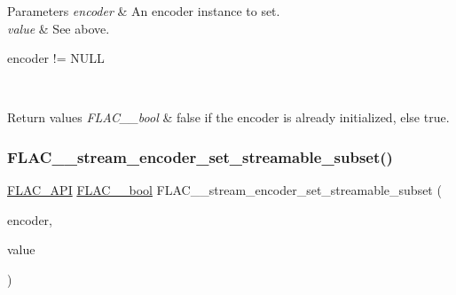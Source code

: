 {} 
\begin{DoxyParams}{Parameters}
{\em encoder} & An encoder instance to set. \\
\hline
{\em value} & See above.  
\begin{DoxyCode}
encoder != NULL 
\end{DoxyCode}
 \\
\hline
\end{DoxyParams}

\begin{DoxyRetVals}{Return values}
{\em F\+L\+A\+C\+\_\+\+\_\+bool} & {\ttfamily false} if the encoder is already initialized, else {\ttfamily true}. \\
\hline
\end{DoxyRetVals}
\mbox{\label{group__flac__stream__encoder_ga163f1acfe8b6b8ae849f0f4f7c0708f4}} 
\subsubsection{\texorpdfstring{F\+L\+A\+C\+\_\+\+\_\+stream\+\_\+encoder\+\_\+set\+\_\+streamable\+\_\+subset()}{FLAC\_\_stream\_encoder\_set\_streamable\_subset()}}
{\footnotesize\ttfamily \hyperlink{group__flac__export_ga56ca07df8a23310707732b1c0007d6f5}{F\+L\+A\+C\+\_\+\+A\+PI} \hyperlink{ordinals_8h_a95103469f1cbd78b8cf250194985b34e}{F\+L\+A\+C\+\_\+\+\_\+bool} F\+L\+A\+C\+\_\+\+\_\+stream\+\_\+encoder\+\_\+set\+\_\+streamable\+\_\+subset (\begin{DoxyParamCaption}\item[{\hyperlink{struct_f_l_a_c_____stream_encoder}{F\+L\+A\+C\+\_\+\+\_\+\+Stream\+Encoder} $\ast$}]{encoder,  }\item[{\hyperlink{ordinals_8h_a95103469f1cbd78b8cf250194985b34e}{F\+L\+A\+C\+\_\+\+\_\+bool}}]{value }\end{DoxyParamCaption})}

